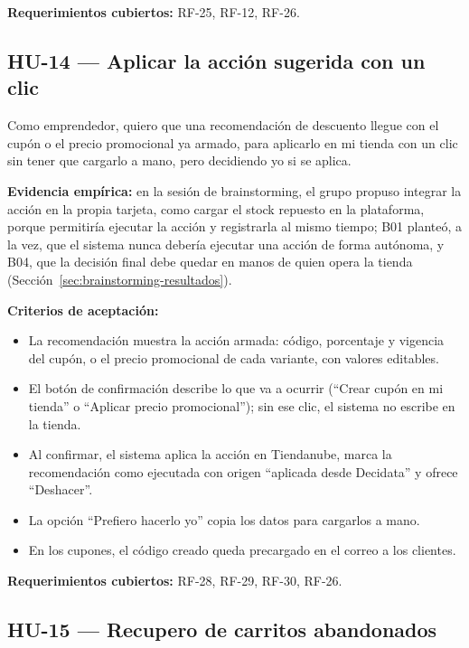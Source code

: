 \noindent\textbf{Requerimientos cubiertos:} RF-25, RF-12, RF-26.

\subsection{HU-14 --- Aplicar la acción sugerida con un clic}
\label{sec:hu-14}

Como emprendedor, quiero que una recomendación de descuento llegue con el cupón o el precio promocional ya armado, para aplicarlo en mi tienda con un clic sin tener que cargarlo a mano, pero decidiendo yo si se aplica.

\noindent\textbf{Evidencia empírica:} en la sesión de brainstorming, el grupo propuso integrar la acción en la propia tarjeta, como cargar el stock repuesto en la plataforma, porque permitiría ejecutar la acción y registrarla al mismo tiempo; B01 planteó, a la vez, que el sistema nunca debería ejecutar una acción de forma autónoma, y B04, que la decisión final debe quedar en manos de quien opera la tienda (Sección~\ref{sec:brainstorming-resultados}).

\noindent\textbf{Criterios de aceptación:}
\begin{itemize}
    \item La recomendación muestra la acción armada: código, porcentaje y vigencia del cupón, o el precio promocional de cada variante, con valores editables.
    \item El botón de confirmación describe lo que va a ocurrir (\enquote{Crear cupón en mi tienda} o \enquote{Aplicar precio promocional}); sin ese clic, el sistema no escribe en la tienda.
    \item Al confirmar, el sistema aplica la acción en Tiendanube, marca la recomendación como ejecutada con origen \enquote{aplicada desde Decidata} y ofrece \enquote{Deshacer}.
    \item La opción \enquote{Prefiero hacerlo yo} copia los datos para cargarlos a mano.
    \item En los cupones, el código creado queda precargado en el correo a los clientes.
\end{itemize}

\noindent\textbf{Requerimientos cubiertos:} RF-28, RF-29, RF-30, RF-26.

\subsection{HU-15 --- Recupero de carritos abandonados}
\label{sec:hu-15}

